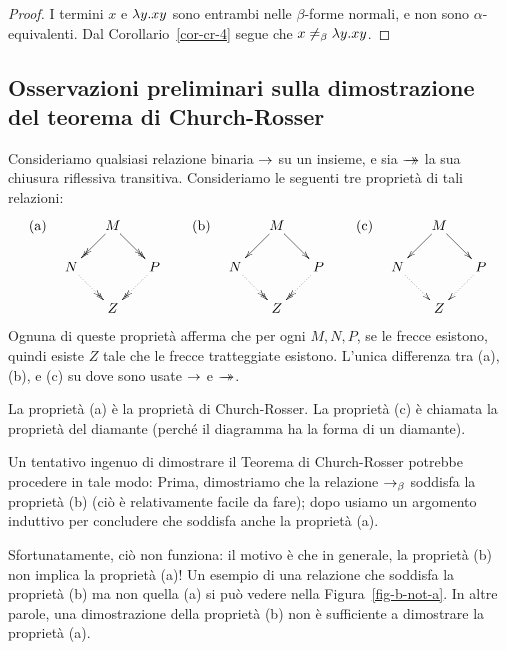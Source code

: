 \documentclass{article}
\begin{document}
\begin{proof}
  I termini $x$ e $\lambda y.xy$ sono entrambi nelle $\beta$-forme normali, e
  non sono $\alpha$-equivalenti. Dal
  Corollario~\ref{cor-cr-4} segue che $x\not=_{\beta} \lambda y.xy$. \eot
\end{proof}

\subsection{Osservazioni preliminari sulla dimostrazione del teorema di Church-Rosser}
\label{subsec-prelim-cr}

Consideriamo qualsiasi relazione binaria $\rightarrow$ su un insieme, e sia $\mathrel{\rightarrow\!\!\!\!\!\rightarrow}$ la sua
chiusura riflessiva transitiva. Consideriamo le seguenti tre
propriet\`a di tali relazioni:
\[ \mbox{(a)} \ssep \xymatrix@dr{M\ar@{->>}[r]\ar@{->>}[d] & P\ar@{.>>}[d]\\ N\ar@{.>>}[r] & Z}
\sep
\mbox{(b)} \ssep \xymatrix@dr{M\ar@{->}[r]\ar@{->}[d] & P\ar@{.>>}[d]\\ N\ar@{.>>}[r] & Z}
\sep
\mbox{(c)} \ssep \xymatrix@dr{M\ar@{->}[r]\ar@{->}[d] & P\ar@{.>}[d]\\ N\ar@{.>}[r] & Z}
\]
Ognuna di queste propriet\`a afferma che per ogni $M,N,P$, se le
frecce esistono, quindi esiste $Z$ tale che le frecce tratteggiate esistono.
L'unica differenza tra (a), (b), e (c) su dove
sono usate $\rightarrow$ e $\mathrel{\rightarrow\!\!\!\!\!\rightarrow}$.

La propriet\`a (a) \`e la propriet\`a di Church-Rosser. La propriet\`a (c) \`e chiamata
la propriet\`a del diamante (perch\'e il diagramma ha la forma di un diamante).

Un tentativo ingenuo di dimostrare il Teorema di Church-Rosser potrebbe procedere
in tale modo: Prima, dimostriamo che la relazione $\rightarrow_{\beta}$ soddisfa la propriet\`a (b)
(ci\`o \`e relativamente facile da fare); dopo usiamo un argomento induttivo per
concludere che soddisfa anche la propriet\`a (a).

Sfortunatamente, ci\`o non funziona: il motivo \`e che in generale,
la propriet\`a (b) non implica la propriet\`a (a)! Un esempio di una
relazione che soddisfa la propriet\`a (b) ma non quella (a) si pu\`o vedere nella
Figura~\ref{fig-b-not-a}. In altre parole, una dimostrazione della propriet\`a (b)
non \`e sufficiente a dimostrare la propriet\`a (a).
\end{document}
